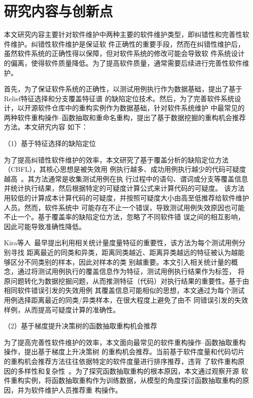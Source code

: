 \section{研究内容与创新点}
本文研究内容主要针对软件维护中两种主要的软件维护类型，即纠错性和完善性软件维护。纠错性软件维护是保证软
件正确性的重要手段，然而在纠错性维护后，虽然软件系统的正确性得以保障，但对软件系统的修改可能会导致软
件系统设计的偏离，使得软件质量降低。为了提高软件质量，通常需要后续进行完善性软件维护。

首先，为了保证软件系统的正确性，以测试用例执行作为数据基础，提出了基于Relief特征选择和分支覆盖特征谱
的缺陷定位技术。然后，为了完善软件系统设计，以开源软件仓库中的重构实例作为数据基础，针对软件系统维护
中最常见的两种软件重构操作--函数抽取和重命名重构，提出了基于数据挖掘的重构机会推荐方法。本文研宄内容
如下：

（1）基于特征选择的缺陷定位

为了提高纠错性软件维护的效率，本文研究了基于覆盖分析的缺陷定位方法（CBFL），其核心思想是被失效用
例执行越多、成功用例执行越少的代码可疑度越高~\cite{jones2005empirical}。其方法通常是收集测试用例在执
行过程中的语句、谓词或分支等覆盖信息并统计执行结果，然后根据特定的可疑度计算公式来计算代码的可疑度。
该方法用较低的计算成本计算代码的可疑度，并按照可疑度大小由高至低推荐给软件维护人员。然而，软件系统中
可能存在不止一个错误，导致测试用例失效原因也可能不止一个。基于覆盖率的缺陷定位方法，忽略了不同软件错
误之间的相互影响，因此可能导致准确性降低。

Kira等人~\cite{kira1992feature}最早提出利用相关统计量度量特征的重要性，该方法为每个测试用例分别寻找
距离最近的同类和异类，距离同类越近、距离异类越远的特征被认为越能够区分不同类别的样本，因此对样本的类
别越重要。本文引入相关统计量的概念，通过将测试用例执行的覆盖信息作为特征，测试用例执行结果作为标签，
将原问题转化为数据挖掘问题，从而推测特征（代码）对执行结果的重要性。基于由相同软件错误引发的失效用例
其覆盖信息可能相似的思想，本文通过为每个测试用例选择距离最近的同类/异类样本，在很大程度上避免了由不
同错误引发的失效样例，从而提高可疑度计算的准确性。

（2）基于梯度提升决策树的函数抽取重构机会推荐

为了提高完善性软件维护的效率，本文面向最常见的软件重构操作--函数抽取重构操作，提出基于梯度上升决策树
的重构机会推荐。当前基于软件度量和代码切片的重构机会推荐方法往往依据特定的软件度量进行排序推荐，违背
了软件重构原因的多样性和复杂性~\cite{silva2016we}。为了探究函数抽取重构的根本原因，本文通过观察开源
软件重构实例，将函数抽取重构作为训练数据，从模型的角度探讨函数抽取重构的原因，并为软件维护人员推荐重
构操作。


